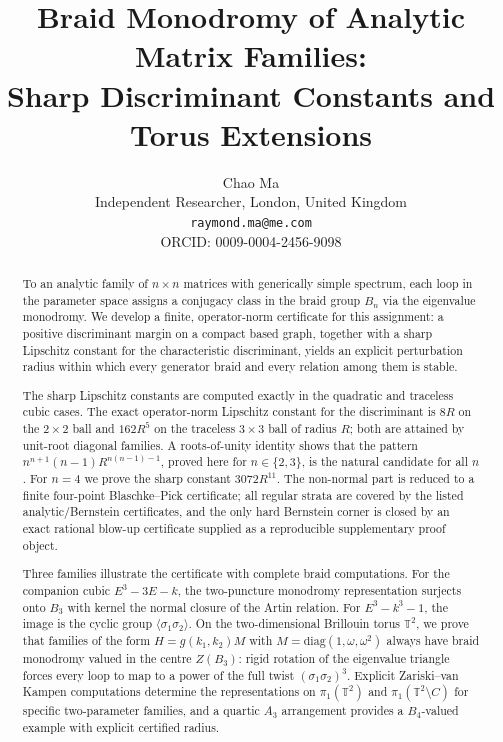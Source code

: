 \documentclass[11pt]{article}
\numberwithin{equation}{section}
\newcommand{\bbT}{\mathbb T}
\begin{document}
\title{Braid Monodromy of Analytic Matrix Families:\\Sharp Discriminant Constants and Torus Extensions}
\author{Chao Ma\\
Independent Researcher, London, United Kingdom\\
\texttt{raymond.ma@me.com}\\
ORCID: 0009-0004-2456-9098}
\date{}
\maketitle

\begin{abstract}
To an analytic family of $n\times n$ matrices with generically simple spectrum,
each loop in the parameter space assigns a conjugacy class in the braid group $B_n$
via the eigenvalue monodromy.  We develop a finite, operator-norm certificate
for this assignment: a positive discriminant margin on a compact based graph,
together with a sharp Lipschitz constant for the characteristic discriminant,
yields an explicit perturbation radius within which every generator braid
and every relation among them is stable.

The sharp Lipschitz constants are computed exactly in the quadratic and
traceless cubic cases.  The exact operator-norm Lipschitz constant for the
discriminant is $8R$ on the $2\times2$ ball and $162R^5$ on the traceless
$3\times3$ ball of radius $R$; both are attained by unit-root diagonal
families.  A roots-of-unity identity shows that the pattern
$n^{n+1}(n-1)R^{n(n-1)-1}$, proved here for \(n\in\{2,3\}\), is the natural
candidate for all \(n\).  For \(n=4\) we prove the sharp constant
\(3072R^{11}\).  The non-normal part is reduced to a finite four-point
Blaschke--Pick certificate; all regular strata are covered by the listed
analytic/Bernstein certificates, and the only hard Bernstein corner is closed
by an exact rational blow-up certificate supplied as a reproducible
supplementary proof object.

Three families illustrate the certificate with complete braid computations.
For the companion cubic $E^3-3E-k$, the two-puncture monodromy representation
surjects onto $B_3$ with kernel the normal closure of the Artin relation.
For $E^3-k^3-1$, the image is the cyclic group $\langle\sigma_1\sigma_2\rangle$.
On the two-dimensional Brillouin torus $\bbT^2$, we prove that families of
the form $H=g(k_1,k_2)M$ with $M=\mathrm{diag}(1,\omega,\omega^2)$ always
have braid monodromy valued in the centre $Z(B_3)$: rigid rotation of the
eigenvalue triangle forces every loop to map to a power of the full twist
$(\sigma_1\sigma_2)^3$.  Explicit Zariski--van Kampen computations determine
the representations on $\pi_1(\bbT^2)$ and $\pi_1(\bbT^2\setminus C)$
for specific two-parameter families, and a quartic $A_3$ arrangement
provides a $B_4$-valued example with explicit certified radius.
\end{abstract}
\end{document}
